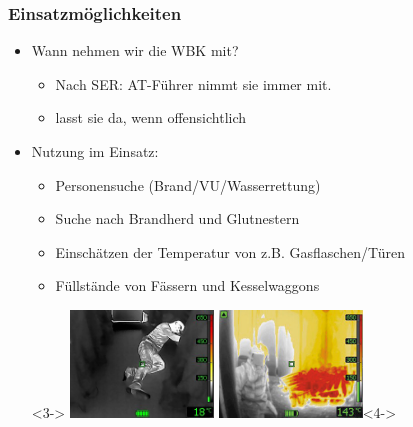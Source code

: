 \documentclass[aspectratio=169]{beamer}
\begin{document}
            \begin{frame}[t]
            \frametitle{Einsatzmöglichkeiten}
            \begin{itemize}
            \item Wann nehmen wir die WBK mit?
            \begin{itemize}
            \item Nach SER: AT-Führer nimmt sie immer mit.
            \item lasst sie da, wenn offensichtlich
            \end{itemize}
            \item<2-> Nutzung im Einsatz:
                \begin{itemize}
                \item<3-> Personensuche (Brand/VU/Wasserrettung)
                    \item<4-> Suche nach Brandherd und Glutnestern
                        \item<5-> Einschätzen der Temperatur von z.B. Gasflaschen/Türen
                            \item<6-> Füllstände von Fässern und Kesselwaggons
                                \end{itemize}
                                \item[]<3-> \includegraphics[width=0.3\textwidth, keepaspectratio]{wuerfelblick_raw/boden} \includegraphics[width=0.3\textwidth, keepaspectratio]{feuer}<4->
                                        \end{itemize}
                                        \end{frame}

\end{document}
